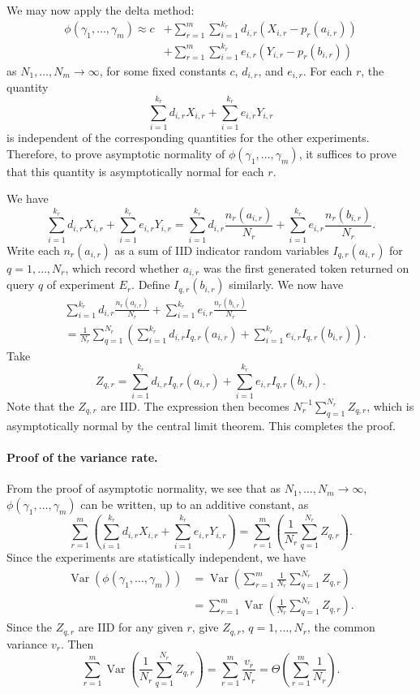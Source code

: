 \documentclass{article}
\begin{document}
We may now apply the delta method:
\begin{align*}
\phi(\gamma_1,\ldots,\gamma_m)
\approx c
&+\sum_{r=1}^{m}\sum_{i=1}^{k_r}d_{i,r}
\left(X_{i,r}-p_r(a_{i,r})\right)\\
&+\sum_{r=1}^{m}\sum_{i=1}^{k_r}e_{i,r}
\left(Y_{i,r}-p_r(b_{i,r})\right)
\end{align*}
as $N_1,\ldots,N_m\to\infty$, for some fixed constants $c$, $d_{i,r}$, and
$e_{i,r}$. For each $r$, the quantity
\[
\sum_{i=1}^{k_r}d_{i,r}X_{i,r}
+\sum_{i=1}^{k_r}e_{i,r}Y_{i,r}
\]
is independent of the corresponding quantities for the other experiments.
Therefore, to prove asymptotic normality of
$\phi(\gamma_1,\ldots,\gamma_m)$, it suffices to prove that this quantity is
asymptotically normal for each $r$.

We have
\[
\sum_{i=1}^{k_r}d_{i,r}X_{i,r}
+\sum_{i=1}^{k_r}e_{i,r}Y_{i,r}
=\sum_{i=1}^{k_r}d_{i,r}\frac{n_r(a_{i,r})}{N_r}
+\sum_{i=1}^{k_r}e_{i,r}\frac{n_r(b_{i,r})}{N_r}.
\]
Write each $n_r(a_{i,r})$ as a sum of IID indicator random variables
$I_{q,r}(a_{i,r})$ for $q=1,\ldots,N_r$, which record whether $a_{i,r}$ was
the first generated token returned on query $q$ of experiment $E_r$. Define
$I_{q,r}(b_{i,r})$ similarly. We now have
\begin{align*}
&\sum_{i=1}^{k_r}d_{i,r}\frac{n_r(a_{i,r})}{N_r}
+\sum_{i=1}^{k_r}e_{i,r}\frac{n_r(b_{i,r})}{N_r}\\
&=\frac{1}{N_r}\sum_{q=1}^{N_r}
\left(\sum_{i=1}^{k_r}d_{i,r}I_{q,r}(a_{i,r})
+\sum_{i=1}^{k_r}e_{i,r}I_{q,r}(b_{i,r})\right).
\end{align*}
Take
\[
Z_{q,r}=\sum_{i=1}^{k_r}d_{i,r}I_{q,r}(a_{i,r})
+\sum_{i=1}^{k_r}e_{i,r}I_{q,r}(b_{i,r}).
\]
Note that the $Z_{q,r}$ are IID. The expression then becomes
$N_r^{-1}\sum_{q=1}^{N_r}Z_{q,r}$, which is asymptotically normal by the
central limit theorem. This completes the proof.

\paragraph{Proof of the variance rate.}
From the proof of asymptotic normality, we see that as
$N_1,\ldots,N_m\to\infty$, $\phi(\gamma_1,\ldots,\gamma_m)$ can be written,
up to an additive constant, as
\[
\sum_{r=1}^{m}\left(
\sum_{i=1}^{k_r}d_{i,r}X_{i,r}
+\sum_{i=1}^{k_r}e_{i,r}Y_{i,r}
\right)
=\sum_{r=1}^{m}\left(
\frac{1}{N_r}\sum_{q=1}^{N_r}Z_{q,r}
\right).
\]
Since the experiments are statistically independent, we have
\begin{align*}
\operatorname{Var}\!\left(\phi(\gamma_1,\ldots,\gamma_m)\right)
&=\operatorname{Var}\!\left(
\sum_{r=1}^{m}\frac{1}{N_r}\sum_{q=1}^{N_r}Z_{q,r}
\right)\\
&=\sum_{r=1}^{m}\operatorname{Var}\!\left(
\frac{1}{N_r}\sum_{q=1}^{N_r}Z_{q,r}
\right).
\end{align*}
Since the $Z_{q,r}$ are IID for any given $r$, give
$Z_{q,r}$, $q=1,\ldots,N_r$, the common variance $v_r$. Then
\[
\sum_{r=1}^{m}\operatorname{Var}\!\left(
\frac{1}{N_r}\sum_{q=1}^{N_r}Z_{q,r}
\right)
=\sum_{r=1}^{m}\frac{v_r}{N_r}
=\Theta\!\left(\sum_{r=1}^{m}\frac{1}{N_r}\right).
\]
\end{document}
